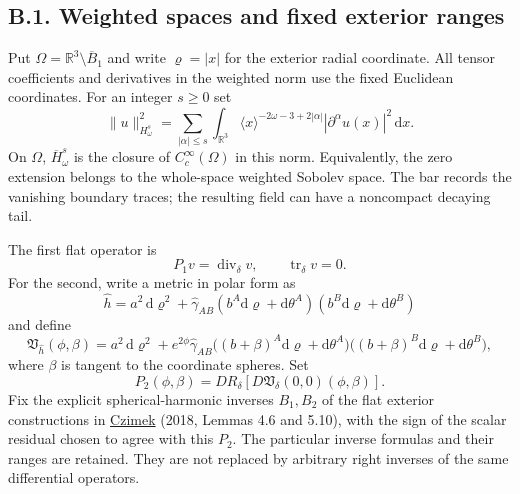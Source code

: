 \documentclass[
  english,
  11pt,
  reqno]{amsart}
\begin{document}
\subsection{B.1. Weighted spaces and fixed exterior
ranges}\label{b.1.-weighted-spaces-and-fixed-exterior-ranges}\label{sec:online-extension-spaces}

Put \(\Omega=\mathbb R^3\setminus\overline B_1\) and write
\(\varrho=|x|\) for the exterior radial coordinate. All tensor
coefficients and derivatives in the weighted norm use the fixed
Euclidean coordinates. For an integer \(s\ge0\) set%
 \[
\|u\|_{H^s_\omega}^2
=\sum_{|\alpha|\le s}
\int_{\mathbb R^3}
\langle x\rangle^{-2\omega-3+2|\alpha|}
|\partial^\alpha u(x)|^2\,\mathrm d x.
\] On \(\Omega\), \(\overline H^s_\omega\) is the closure of
\(C_c^\infty(\Omega)\) in this norm. Equivalently, the zero extension
belongs to the whole-space weighted Sobolev space. The bar records the
vanishing boundary traces; the resulting field can have a noncompact
decaying tail.

The first flat operator is \[
P_1v=\operatorname{div}_\delta v,
\qquad \operatorname{tr}_\delta v=0.
\] For the second, write a metric in polar form as \[
\widehat h=a^2\,\mathrm d\varrho^2
+\widehat\gamma_{AB}
(b^A\mathrm d\varrho+\mathrm d\theta^A)
(b^B\mathrm d\varrho+\mathrm d\theta^B)
\] and define%
 \[
\mathfrak V_{\widehat h}(\phi,\beta)
=a^2\,\mathrm d\varrho^2
+e^{2\phi}\widehat\gamma_{AB}
\bigl((b+\beta)^A\mathrm d\varrho+\mathrm d\theta^A\bigr)
\bigl((b+\beta)^B\mathrm d\varrho+\mathrm d\theta^B\bigr),
\] where \(\beta\) is tangent to the coordinate spheres. Set \[
P_2(\phi,\beta)
=D R_\delta\!\left[D\mathfrak V_\delta(0,0)(\phi,\beta)\right].
\] Fix the explicit spherical-harmonic inverses \(B_1,B_2\) of the flat
exterior constructions in \hyperref[ref-Czimek2018]{Czimek} (2018,
Lemmas 4.6 and 5.10), with the sign of the scalar residual chosen to
agree with this \(P_2\). The particular inverse formulas and their
ranges are retained. They are not replaced by arbitrary right inverses
of the same differential operators.
\end{document}
